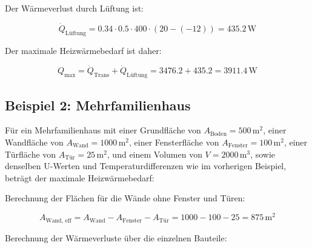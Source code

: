 \documentclass{article}
\begin{document}
Der Wärmeverlust durch Lüftung ist:

\begin{equation}
\dot{Q}_\text{Lüftung} = 0.34 \cdot 0.5 \cdot 400 \cdot (20 - (-12)) = 435.2 \, \text{W}
\end{equation}

Der maximale Heizwärmebedarf ist daher:

\begin{equation}
Q_\text{max} = \dot{Q}_\text{Trans} + \dot{Q}_\text{Lüftung} = 3476.2 + 435.2 = 3911.4 \, \text{W}
\end{equation}

\subsection*{Beispiel 2: Mehrfamilienhaus}

Für ein Mehrfamilienhaus mit einer Grundfläche von \(A_\text{Boden} = 500 \, \text{m}^2\), einer Wandfläche von \(A_\text{Wand} = 1000 \, \text{m}^2\), einer Fensterfläche von \(A_\text{Fenster} = 100 \, \text{m}^2\), einer Türfläche von \(A_\text{Tür} = 25 \, \text{m}^2\), und einem Volumen von \(V = 2000 \, \text{m}^3\), sowie denselben U-Werten und Temperaturdifferenzen wie im vorherigen Beispiel, beträgt der maximale Heizwärmebedarf:

Berechnung der Flächen für die Wände ohne Fenster und Türen:

\begin{equation}
A_\text{Wand, eff} = A_\text{Wand} - A_\text{Fenster} - A_\text{Tür} = 1000 - 100 - 25 = 875 \, \text{m}^2
\end{equation}

Berechnung der Wärmeverluste über die einzelnen Bauteile:
\end{document}
